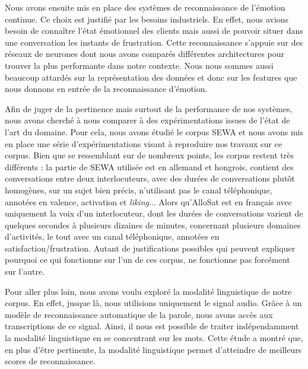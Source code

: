 Nous avons ensuite mis en place des systèmes de reconnaissance de l'émotion continue. Ce choix est justifié par les besoins industriels. En effet, nous avions besoin de connaître l'état émotionnel des clients mais aussi de pouvoir situer dans une conversation les instants de frustration. Cette reconnaissance s'appuie sur des réseaux de neurones dont nous avons comparés différentes architectures pour trouver la plus performante dans notre contexte. Nous nous sommes aussi beaucoup attardés sur la représentation des données et donc sur les features que nous donnons en entrée de la reconnaissance d'émotion.

Afin de juger de la pertinence mais surtout de la performance de nos systèmes, nous avons cherché à nous comparer à des expérimentations issues de l'état de l'art du domaine. Pour cela, nous avons étudié le corpus SEWA et nous avons mis en place une série d'expérimentations visant à reproduire nos travaux sur ce corpus. Bien que se ressemblant sur de nombreux points, les corpus restent très différents : la partie de SEWA utilisée est en allemand et hongrois, contient des conversations entre deux interlocuteurs, avec des durées de conversations plutôt homogènes, sur un sujet bien précis, n'utilisant pas le canal téléphonique, annotées en valence, activation et \textit{liking}... Alors qu'AlloSat est en français avec uniquement la voix d'un interlocuteur, dont les durées de conversations varient de quelques secondes à plusieurs dizaines de minutes, concernant plusieurs domaines d'activités, le tout avec un canal téléphonique, annotées en satisfaction/frustration. Autant de justifications possibles qui peuvent expliquer pourquoi ce qui fonctionne sur l'un de ces corpus, ne fonctionne pas forcément sur l'autre.

Pour aller plus loin, nous avons voulu exploré la modalité linguistique de notre corpus. En effet, jusque là, nous utilisions uniquement le signal audio. Grâce à un modèle de reconnaissance automatique de la parole, nous avons accès aux transcriptions de ce signal. Ainsi, il nous est possible de traiter indépendamment la modalité linguistique en se concentrant sur les mots. Cette étude a montré que, en plus d'être pertinente, la modalité linguistique permet d'atteindre de meilleurs scores de reconnaissance. %

